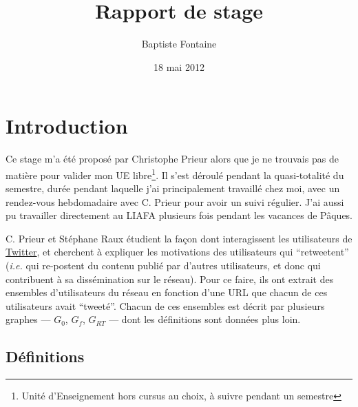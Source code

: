 \documentclass[]{article}
\title{Rapport de stage}
\author{Baptiste Fontaine}
\date{18 mai 2012}
\begin{document}
\maketitle

\section{Introduction}

Ce stage m'a été proposé par Christophe Prieur alors que je ne trouvais
pas de matière pour valider mon UE libre\footnote{Unité d'Enseignement
  hors cursus au choix, à suivre pendant un semestre}. Il s'est déroulé
pendant la quasi-totalité du semestre, durée pendant laquelle j'ai
principalement travaillé chez moi, avec un rendez-vous hebdomadaire avec
C. Prieur pour avoir un suivi régulier. J'ai aussi pu travailler
directement au LIAFA plusieurs fois pendant les vacances de Pâques.

C. Prieur et Stéphane Raux étudient la façon dont interagissent les
utilisateurs de \href{https://twitter.com/}{Twitter}, et cherchent à
expliquer les motivations des utilisateurs qui ``retweetent''
(\emph{i.e.} qui re-postent du contenu publié par d'autres utilisateurs,
et donc qui contribuent à sa dissémination sur le réseau). Pour ce
faire, ils ont extrait des ensembles d'utilisateurs du réseau en
fonction d'une URL que chacun de ces utilisateurs avait ``tweeté''.
Chacun de ces ensembles est décrit par plusieurs graphes --- $G_{0}$, $G_{f}$,
$G_{RT}$ --- dont les définitions sont données plus loin.

\subsection{Définitions}
\end{document}
